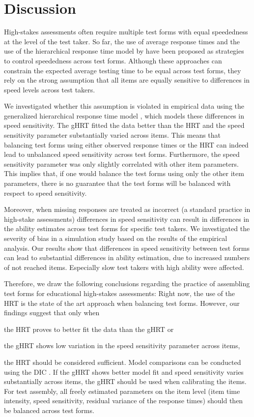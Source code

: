 \documentclass[a4paper,man,apacite,donotrepeattitle]{apa6}
\begin{document}
\section{Discussion}
High-stakes assessments often require multiple test forms with equal speededness at the level of the test taker. So far, the use of average response times and the use of the hierarchical response time model by  have been proposed as strategies to control speededness across test forms. Although these approaches can constrain the expected average testing time to be equal across test forms, they rely on the strong assumption that all items are equally sensitive to differences in speed levels across test takers. 

We investigated whether this assumption is violated in empirical data using the generalized hierarchical response time model \cite{Fox.2007, KleinEntink.2009}, which models these differences in speed sensitivity. The gHRT fitted the data better than the HRT and the speed sensitivity parameter substantially varied across items. This means that balancing test forms using either observed response times or the HRT can indeed lead to unbalanced speed sensitivity across test forms. Furthermore, the speed sensitivity parameter was only slightly correlated with other item parameters. This implies that, if one would balance the test forms using only the other item parameters, there is no guarantee that the test forms will be balanced with respect to speed sensitivity.

Moreover, when missing responses are treated as incorrect (a standard practice in high-stake assessments) differences in speed sensitivity can result in differences in the ability estimates across test forms for specific test takers. We investigated the severity of bias in a simulation study based on the results of the empirical analysis. Our results show that differences in speed sensitivity between test forms can lead to substantial differences in ability estimation, due to increased numbers of not reached items. Especially slow test takers with high ability were affected. 

Therefore, we draw the following conclusions regarding the practice of assembling test forms for educational high-stakes assessments: Right now, the use of the HRT is the state of the art approach when balancing test forms. However, our findings suggest that only when 
\begin{seriate}
\item the HRT proves to better fit the data than the gHRT or 
\item the gHRT shows low variation in the speed sensitivity parameter across items,
\end{seriate}
the HRT should be considered sufficient. Model comparisons can be conducted using the DIC \cite{Spiegelhalter.2002}. If the gHRT shows better model fit and speed sensitivity varies substantially across items, the gHRT should be used when calibrating the items. For test assembly, all freely estimated parameters on the item level (item time intensity, speed sensitivity, residual variance of the response times) should then be balanced across test forms. 
\end{document}

